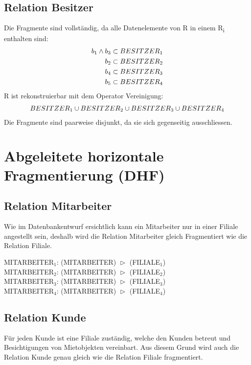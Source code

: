\documentclass[11pt,a4paper,parskip=half]{scrartcl}
\begin{document}
\subsection{Relation Besitzer}
Die Fragmente sind vollständig, da alle Datenelemente von R in einem R\textsubscript{i} enthalten sind:\\
\begin{align*}
b\textsubscript{1} \wedge b\textsubscript{3} \subset  BESITZER\textsubscript{1}\\
b\textsubscript{2} \subset  BESITZER\textsubscript{2}\\
b\textsubscript{4} \subset  BESITZER\textsubscript{3}\\
b\textsubscript{5} \subset  BESITZER\textsubscript{4}\\
\end{align*}
R ist rekonstruierbar mit dem Operator Vereinigung:\\
\begin{align*}
BESITZER\textsubscript{1} \cup BESITZER\textsubscript{2} \cup BESITZER\textsubscript{3} \cup BESITZER\textsubscript{4}\\
\end{align*}
Die Fragmente sind paarweise disjunkt, da sie sich gegenseitig ausschliessen.

\section{Abgeleitete horizontale Fragmentierung (DHF)}
\subsection{Relation Mitarbeiter}
Wie im Datenbankentwurf ersichtlich kann ein Mitarbeiter nur in einer Filiale angestellt sein, deshalb wird die Relation Mitarbeiter gleich Fragmentiert wie die Relation Filiale. 

MITARBEITER$_1$: (MITARBEITER) $\vartriangleright$ (FILIALE$_1$)\\
MITARBEITER$_2$: (MITARBEITER) $\vartriangleright$ (FILIALE$_2$)\\
MITARBEITER$_3$: (MITARBEITER) $\vartriangleright$ (FILIALE$_3$)\\
MITARBEITER$_4$: (MITARBEITER) $\vartriangleright$ (FILIALE$_4$)

\subsection{Relation Kunde}
Für jeden Kunde ist eine Filiale zuständig, welche den Kunden betreut und Besichtigungen von Mietobjekten vereinbart. Aus diesem Grund wird auch die Relation Kunde genau gleich wie die Relation Filiale fragmentiert. 
\end{document}
